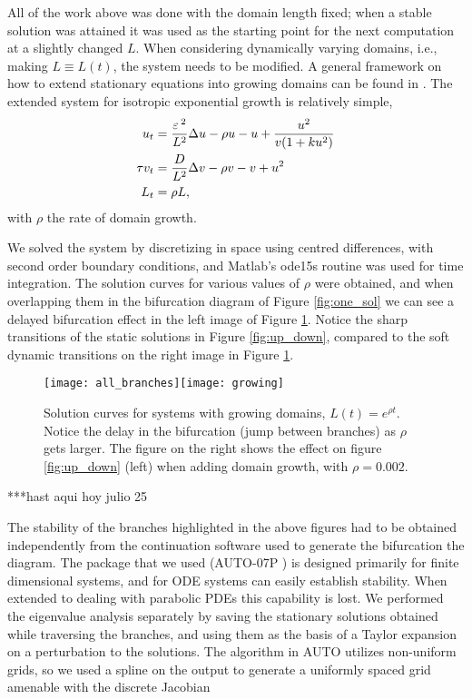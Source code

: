 All of the work above was done with the domain length fixed; when a stable solution was attained it was used as the starting point for the next computation at a slightly changed $L$. When considering dynamically varying domains, i.e., making $L\equiv L(t)$, the system needs to be modified. A general framework on how to extend stationary equations into growing domains can be found in \cite{plaza2004growth}. The extended system for isotropic exponential growth is relatively simple, 
% 
\begin{equation*}
\label{eqn:gms_growth}
\begin{split}
\begin{aligned}
	u_t &= \frac{\varepsilon\,^2}{L^2}\Delta u -\rho u - u +\frac{u^2}{v(1+ku^2)} \\
	\tau v_t &= \frac{D}{L^2}\Delta v - \rho v - v + u^2 \\
	L_t &= \rho L,
\end{aligned}
\end{split}
\end{equation*}
% 
with $\rho$ the rate of domain growth. 

We solved the system by discretizing in space using centred differences, with second order boundary conditions, and Matlab's ode15s routine was used for time integration. The solution curves for various values of $\rho$ were obtained, and when overlapping them in the bifurcation diagram of Figure \ref{fig:one_sol} we can see a delayed bifurcation effect in the left image of Figure \ref{fig:growth}. Notice the sharp transitions of the static solutions in Figure \ref{fig:up_down}, compared to the soft dynamic transitions on the right image in Figure \ref{fig:growth}. 
% 
\begin{figure}[htb]
\begin{center}
\texttt{[image: all\_branches]}\texttt{[image: growing]}
\caption{Solution curves for systems with growing domains, $L(t)=e^{\rho t}$. Notice the delay in the bifurcation (jump between branches) as $\rho$ gets larger. The figure on the right shows the effect on figure \ref{fig:up_down} (left) when adding domain growth, with $\rho=0.002$.}
\label{fig:growth}
\end{center}
\end{figure}
% 

***hast aqui hoy julio 25

The stability of the branches highlighted in the above figures had to be obtained independently from the continuation software used to generate the bifurcation the diagram. The package that we used (AUTO-07P \cite{doedel_auto-07p}) is designed primarily for finite dimensional systems, and for ODE systems can easily establish stability. When extended to dealing with parabolic PDEs this capability is lost. We performed the eigenvalue analysis separately by saving the stationary solutions obtained while traversing the branches, and using them as the basis of a Taylor expansion on a perturbation to the solutions. The algorithm in AUTO utilizes non-uniform grids, so we used a spline on the output to generate a uniformly spaced grid amenable with the discrete Jacobian

